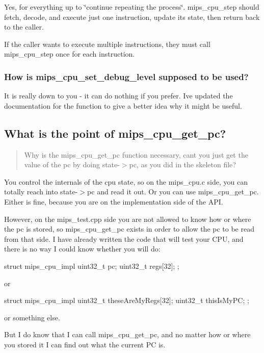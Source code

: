 Yes, for everything up to \char`\"{}continue repeating the process\char`\"{}. mips\+\_\+cpu\+\_\+step should fetch, decode, and execute just one instruction, update its state, then return back to the caller.

If the caller wants to execute multiple instructions, they must call mips\+\_\+cpu\+\_\+step once for each instruction.

\subsubsection*{How is {\ttfamily mips\+\_\+cpu\+\_\+set\+\_\+debug\+\_\+level} supposed to be used?}

It is really down to you -\/ it can do nothing if you prefer. I\textquotesingle{}ve updated the documentation for the function to give a better idea why it might be useful.

\subsection*{What is the point of {\ttfamily mips\+\_\+cpu\+\_\+get\+\_\+pc}?}

\begin{quote}
Why is the mips\+\_\+cpu\+\_\+get\+\_\+pc function necessary, can\textquotesingle{}t you just get the value of the pc by doing state-\/$>$pc, as you did in the skeleton file? \end{quote}


You control the internals of the cpu state, so on the {\ttfamily mips\+\_\+cpu.\+c} side, you can totally reach into {\ttfamily state-\/$>$pc} and read it out. Or you can use {\ttfamily mips\+\_\+cpu\+\_\+get\+\_\+pc}. Either is fine, because you are on the implementation side of the A\+P\+I.

However, on the {\ttfamily mips\+\_\+test.\+cpp} side you are not allowed to know how or where the pc is stored, so {\ttfamily mips\+\_\+cpu\+\_\+get\+\_\+pc} exists in order to allow the pc to be read from that side. I have already written the code that will test your C\+P\+U, and there is no way I could know whether you will do\+: \begin{DoxyVerb}struct mips_cpu_impl{
  uint32_t pc;
  uint32_t regs[32];
};
\end{DoxyVerb}


or \begin{DoxyVerb}struct mips_cpu_impl{
  uint32_t theseAreMyRegs[32];
  uint32_t thisIsMyPC;
};
\end{DoxyVerb}


or something else.

But I do know that I can call {\ttfamily mips\+\_\+cpu\+\_\+get\+\_\+pc}, and no matter how or where you stored it I can find out what the current P\+C is. 